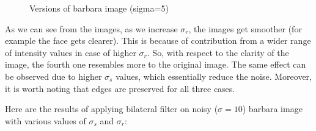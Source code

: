 \documentclass[12pt]{article}
\begin{document}
\begin{figure}[h]
    \caption{Versions of barbara image (sigma=5)}
    \label{fig:overall}
\end{figure}

As we can see from the images, as we increase $\sigma_r$, the images get smoother (for example the face gets clearer). This is because of contribution from a wider range of intensity values in case of higher $\sigma_r$. So, with respect to the clarity of the image, the fourth one resembles more to the original image. The same effect can be observed due to higher $\sigma_s$ values, which essentially reduce the noise. Moreover, it is worth noting that edges are preserved for all three cases.


Here are the results of applying bilateral filter on noisy ($\sigma = 10$) barbara image with various values of $\sigma_s$ and $\sigma_r$:
\end{document}
